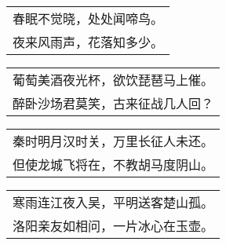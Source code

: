 \noindent\begin{minipage}{\linewidth}
  \vskip-3pt\begin{table}[H]
    \centering
    \begin{tabular}{@{}l@{}}
春眠不觉晓，处处闻啼鸟。\\
夜来风雨声，花落知多少。
    \end{tabular}
  \end{table}
\end{minipage}
\vspace{1cm}


\noindent\begin{minipage}{\linewidth}
  \vskip-3pt\begin{table}[H]
    \centering
    \begin{tabular}{@{}l@{}}
葡萄美酒夜光杯，欲饮琵琶马上催。\\
醉卧沙场君莫笑，古来征战几人回？
    \end{tabular}
  \end{table}
\end{minipage}
\vspace{1cm}


\noindent\begin{minipage}{\linewidth}
  \vskip-3pt\begin{table}[H]
    \centering
    \begin{tabular}{@{}l@{}}
秦时明月汉时关，万里长征人未还。\\
但使龙城飞将在，不教胡马度阴山。
    \end{tabular}
  \end{table}
\end{minipage}
\vspace{1cm}


\noindent\begin{minipage}{\linewidth}
  \vskip-3pt\begin{table}[H]
    \centering
    \begin{tabular}{@{}l@{}}
寒雨连江夜入吴，平明送客楚山孤。\\
洛阳亲友如相问，一片冰心在玉壶。
    \end{tabular}
  \end{table}
\end{minipage}
\vspace{1cm}


